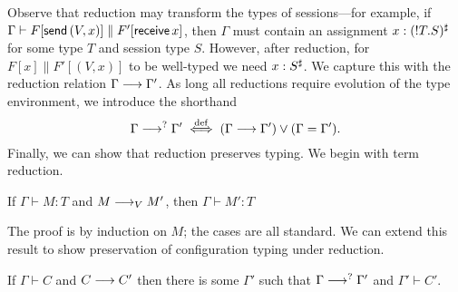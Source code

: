 \documentclass[oribibl,orivec,envcountsame]{llncs}
\begin{document}
Observe that reduction may transform the types of sessions---for example, if $\Gamma \vdash
F[\mathsf{send}\,(V,x)] \parallel F'[\mathsf{receive}\, x]$, then $\Gamma$ must contain an
assignment $x : ({!T.S})^\sharp$ for some type $T$ and session type $S$.  However, after
reduction, for $F[x] \parallel F'[(V,x)]$ to be well-typed we need $x:S^\sharp$.  We capture this
with the reduction relation $\Gamma \longrightarrow \Gamma'$.  As long all reductions require evolution of
the type environment, we introduce the shorthand
\[
  \Gamma \longrightarrow^? \Gamma' \stackrel{\mathrm{def}}{\iff} (\Gamma \longrightarrow \Gamma') \lor (\Gamma = \Gamma').
\]
Finally, we can show that reduction preserves typing.  We begin with term reduction.
%
\begin{lemma}\label{thm:term-preservation}
  If $\Gamma \vdash M: T$ and $M \longrightarrow_V M'$, then $\Gamma \vdash M': T$
\end{lemma}
%
The proof is by induction on $M$; the cases are all standard.  We can extend this result to show
preservation of configuration typing under reduction.
%
\begin{theorem}\label{thm:preservation}
  If $\Gamma \vdash C$ and $C \longrightarrow C'$ then there is some $\Gamma'$ such that $\Gamma \longrightarrow^?
  \Gamma'$ and $\Gamma' \vdash C'$.
\end{theorem}
%
\end{document}
